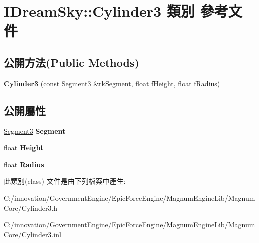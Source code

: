 \hypertarget{class_i_dream_sky_1_1_cylinder3}{}\section{I\+Dream\+Sky\+:\+:Cylinder3 類別 參考文件}
\label{class_i_dream_sky_1_1_cylinder3}
\subsection*{公開方法(Public Methods)}
\begin{DoxyCompactItemize}
\item 
{\bfseries Cylinder3} (const \hyperlink{class_i_dream_sky_1_1_segment3}{Segment3} \&rk\+Segment, float f\+Height, float f\+Radius)\hypertarget{class_i_dream_sky_1_1_cylinder3_aafda8c791522892da695c957515e9464}{}\label{class_i_dream_sky_1_1_cylinder3_aafda8c791522892da695c957515e9464}

\end{DoxyCompactItemize}
\subsection*{公開屬性}
\begin{DoxyCompactItemize}
\item 
\hyperlink{class_i_dream_sky_1_1_segment3}{Segment3} {\bfseries Segment}\hypertarget{class_i_dream_sky_1_1_cylinder3_a171c5d8ca1c50ab43ef63088f57d0db6}{}\label{class_i_dream_sky_1_1_cylinder3_a171c5d8ca1c50ab43ef63088f57d0db6}

\item 
float {\bfseries Height}\hypertarget{class_i_dream_sky_1_1_cylinder3_ad98ee0606dfb522064dd9976c5c6f60e}{}\label{class_i_dream_sky_1_1_cylinder3_ad98ee0606dfb522064dd9976c5c6f60e}

\item 
float {\bfseries Radius}\hypertarget{class_i_dream_sky_1_1_cylinder3_ae7cd278e7571fc8bfd686ef883628126}{}\label{class_i_dream_sky_1_1_cylinder3_ae7cd278e7571fc8bfd686ef883628126}

\end{DoxyCompactItemize}


此類別(class) 文件是由下列檔案中產生\+:\begin{DoxyCompactItemize}
\item 
C\+:/innovation/\+Government\+Engine/\+Epic\+Force\+Engine/\+Magnum\+Engine\+Lib/\+Magnum\+Core/Cylinder3.\+h\item 
C\+:/innovation/\+Government\+Engine/\+Epic\+Force\+Engine/\+Magnum\+Engine\+Lib/\+Magnum\+Core/Cylinder3.\+inl\end{DoxyCompactItemize}
